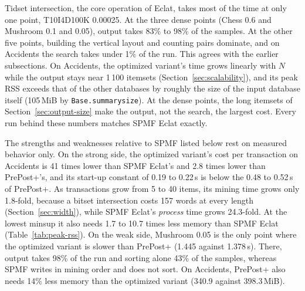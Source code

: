 Tidset intersection, the core operation of Eclat, takes most of the time at only one
point, T10I4D100K 0.00025. At the three dense points (Chess 0.6 and Mushroom
0.1 and 0.05), output takes 83\% to 98\% of the samples. At the other five points,
building the vertical layout and counting pairs dominate, and on Accidents the search
takes under 1\% of the run. This agrees with the earlier subsections. On Accidents, the
optimized variant's time grows linearly with $N$ while the output stays near 1\,100
itemsets (Section~\ref{sec:scalability}), and its peak RSS exceeds that of the other
databases by roughly the size of the input database itself (105\,MiB by
\texttt{Base.summarysize}). At the dense points, the long itemsets of
Section~\ref{sec:output-size} make the output, not the search, the largest cost. Every
run behind these numbers matches SPMF Eclat exactly.

The strengths and weaknesses relative to SPMF listed below rest on measured behavior
only. On the strong side, the optimized variant's cost per transaction on Accidents is 41 times lower
than SPMF Eclat's and 2.8 times lower than PrePost+'s, and its start-up constant of 0.19
to 0.22\,s is below the 0.48 to 0.52\,s of PrePost+. As transactions grow from 5 to 40
items, its mining time grows only 1.8-fold, because a bitset intersection costs 157 words
at every length (Section~\ref{sec:width}), while SPMF Eclat's \emph{process} time grows
24.3-fold. At the lowest minsup it also needs 1.7 to 10.7 times less memory than SPMF
Eclat (Table~\ref{tab:peak-rss}). On the weak side, Mushroom 0.05 is the only point where the
optimized variant is slower than PrePost+ (1.445 against 1.378\,s). There, output takes
98\% of the run and sorting alone 43\% of the samples, whereas SPMF writes in mining order
and does not sort. On Accidents, PrePost+ also needs 14\% less memory than the optimized
variant (340.9 against 398.3\,MiB).

